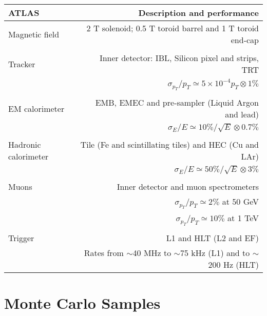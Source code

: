 \documentclass[UKenglish,texlive=2013]{\ATLASLATEXPATH atlasdoc}
\begin{document}
\begin{table}
\begin{center}
\begin{tabular}{l|r}
\hline
\hline
ATLAS    & Description and performance  \\
\hline

Magnetic field      & 2 T solenoid; 0.5 T toroid barrel and 1 T toroid end-cap         \\
\\
\cline{1-1}
Tracker       & Inner detector: IBL, Silicon pixel and strips, TRT\\
          & $\sigma_{p_T}/p_T \simeq   5\times 10^{-4}p_T \otimes 1\% $           \\
          \\
\cline{1-1}
EM calorimeter       & EMB, EMEC and pre-sampler (Liquid Argon and lead)           \\
& $\sigma_{E}/E \simeq 10\%/\sqrt{E} \otimes 0.7\%$ \\
\\
\cline{1-1}
Hadronic calorimeter & Tile (Fe and scintillating tiles) and HEC (Cu and LAr)              \\
& $\sigma_{E}/E \simeq 50\%/\sqrt{E} \otimes 3\%$ \\
\\
\cline{1-1}
Muons & Inner detector and muon spectrometers \\
          & $\sigma_{p_T}/p_T \simeq   2\% $ at 50 GeV           \\
          & $\sigma_{p_T}/p_T \simeq   10\%$ at 1  TeV           \\
\\
\cline{1-1}
Trigger &  L1 and HLT (L2 and EF)\\
& Rates from $\sim$40 MHz to $\sim$75 kHz (L1) and to $\sim$200 Hz (HLT)\\

\hline
\hline
\end{tabular}
\end{center}
\end{table}
\section{Monte Carlo Samples}
\label{sec:mcsample}
\end{document}
